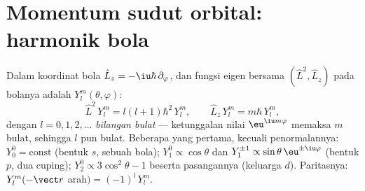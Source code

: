 \section{Momentum sudut orbital: harmonik bola}

\begin{proposition}\label{prop:b3:quantum-angular-momentum:harmonics}
Dalam koordinat bola $\hat L_z = -\iu\hbar\,\partial_\varphi$,
dan fungsi eigen bersama $(\hat L^2, \hat L_z)$ pada bolanya adalah
\emph{} $Y_l^m(\theta, \varphi)$:
\[
\hat L^2\,Y_l^m = l(l+1)\hbar^2\,Y_l^m , \qquad
\hat L_z\,Y_l^m = m\hbar\,Y_l^m ,
\]
dengan $l = 0, 1, 2, \dots$ \emph{bilangan bulat} --- ketunggalan nilai
$\eu^{\iu m\varphi}$ memaksa $m$ bulat, sehingga $l$ pun bulat. Beberapa
yang pertama, kecuali penormalannya: $Y_0^0 = \text{const}$ (bentuk $s$,
sebuah bola); $Y_1^0 \propto \cos\theta$ dan $Y_1^{\pm1}
\propto \sin\theta\,\eu^{\pm\iu\varphi}$ (bentuk $p$, dua cuping);
$Y_2^0 \propto 3\cos^2\theta - 1$ beserta pasangannya (keluarga $d$).
Paritasnya: $Y_l^m(-\vect r$ arah$) = (-1)^l\,Y_l^m$.
\end{proposition}
\admitted

